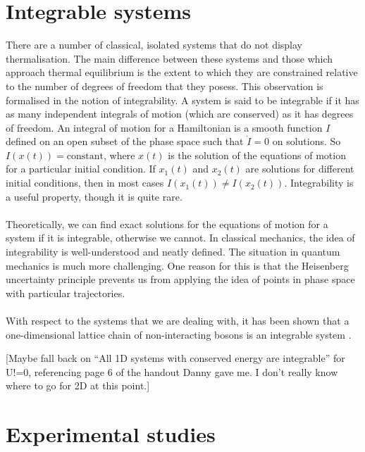 \documentclass[a4paper,10pt]{article}
\begin{document}
\section{Integrable systems}
There are a number of classical, isolated systems that do not display thermalisation. The main difference between these systems and those which approach thermal equilibrium is the extent to which
they are constrained relative to the number of degrees of freedom that they posess. This observation is formalised in the notion of integrability. A system is said to be integrable if it has  as 
many independent integrals of motion (which are conserved) as it has degrees of freedom. An integral of motion for a Hamiltonian is a smooth function $I$ defined on an open subset of the 
phase space such that $\dot{I}=0$ on solutions. So $I(x(t))=\text{constant}$, where $x(t)$ is the solution of the equations of motion
for a particular initial condition. If $x_1(t)$ and $x_2(t)$ are solutions for different initial conditions, then in most cases $I(x_1(t))\ne I(x_2(t))$.
Integrability is a useful property, though it is quite rare. \\\\

Theoretically, we can find exact solutions for the equations of motion for a system if it is integrable, otherwise we cannot. 
In classical mechanics, the idea of integrability is well-understood and neatly defined. The situation in quantum mechanics is much more challenging. One reason for this is that 
the Heisenberg uncertainty principle prevents us from applying the idea of points in phase space with particular trajectories. 
\\\\
With respect to the systems that we are dealing with, it has been shown that a one-dimensional lattice chain of non-interacting bosons is an integrable system \cite{Rigol2007}. 



 [Maybe fall back on ``All 1D systems with conserved energy are integrable'' for U!=0, referencing page 6 of the handout Danny gave me. I don't really know where 
to go for 2D at this point.]


\section{Experimental studies}
\end{document}
